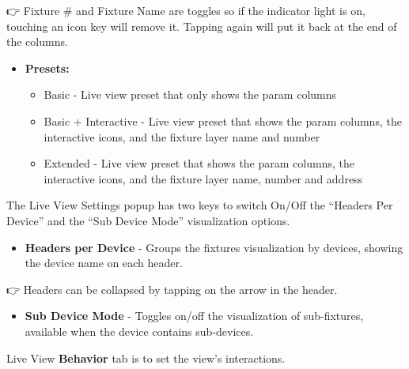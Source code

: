 \documentclass[
]{article}
\providecommand{\tightlist}{%
  \setlength{\itemsep}{0pt}\setlength{\parskip}{0pt}}
\begin{document}
👉 {Fixture \# and Fixture Name are toggles so if the indicator light is on, touching an icon key will remove it. Tapping again will put it back at the end of the columns.}

\begin{itemize}
\item
  \textbf{Presets:}

  \begin{itemize}
  \item
    Basic - Live view preset that only shows the param columns
  \item
    Basic + Interactive - Live view preset that shows the param columns, the interactive icons, and the fixture layer name and number
  \item
    Extended - Live view preset that shows the param columns, the interactive icons, and the fixture layer name, number and address
  \end{itemize}
\end{itemize}

The Live View Settings popup has two keys to switch On/Off the ``Headers Per Device'' and the ``Sub Device Mode'' visualization options.

\begin{itemize}
\tightlist
\item
  \textbf{Headers per Device} - Groups the fixtures visualization by devices, showing the device name on each header.
\end{itemize}

👉 Headers can be collapsed by tapping on the arrow in the header.

\begin{itemize}
\tightlist
\item
  \textbf{Sub Device Mode} - Toggles on/off the visualization of sub-fixtures, available when the device contains sub-devices.
\end{itemize}

Live View \textbf{Behavior} tab is to set the view's interactions.
\end{document}
